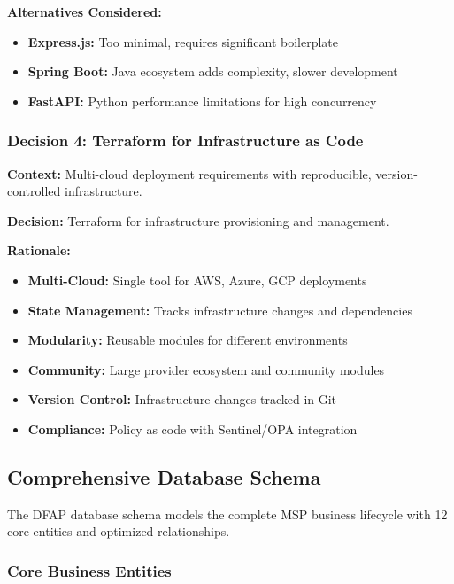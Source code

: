 \textbf{Alternatives Considered:}
\begin{itemize}
  \item \textbf{Express.js:} Too minimal, requires significant boilerplate
  \item \textbf{Spring Boot:} Java ecosystem adds complexity, slower development
  \item \textbf{FastAPI:} Python performance limitations for high concurrency
\end{itemize}

\subsubsection{Decision 4: Terraform for Infrastructure as Code}

\textbf{Context:} Multi-cloud deployment requirements with reproducible, version-controlled infrastructure.

\textbf{Decision:} Terraform for infrastructure provisioning and management.

\textbf{Rationale:}
\begin{itemize}
  \item \textbf{Multi-Cloud:} Single tool for AWS, Azure, GCP deployments
  \item \textbf{State Management:} Tracks infrastructure changes and dependencies
  \item \textbf{Modularity:} Reusable modules for different environments
  \item \textbf{Community:} Large provider ecosystem and community modules
  \item \textbf{Version Control:} Infrastructure changes tracked in Git
  \item \textbf{Compliance:} Policy as code with Sentinel/OPA integration
\end{itemize}

\subsection{Comprehensive Database Schema}

The DFAP database schema models the complete MSP business lifecycle with 12 core entities and optimized relationships.

\subsubsection{Core Business Entities}

